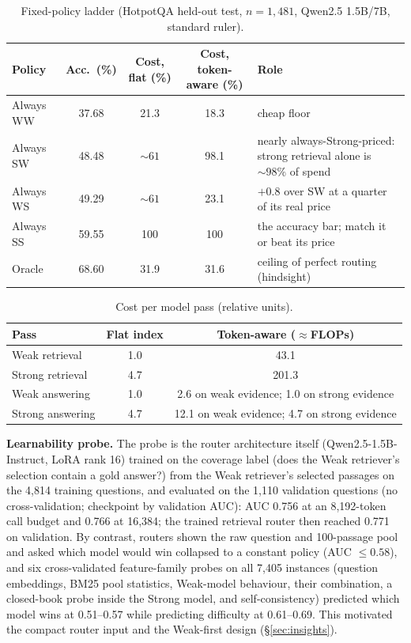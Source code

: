 \documentclass{article}
\newcommand{\W}{\textsc{W}}
\newcommand{\Sg}{\textsc{S}}
\begin{document}
\begin{table}[h]
\caption{Fixed-policy ladder (HotpotQA held-out test, $n{=}1{,}481$, Qwen2.5 1.5B/7B, standard ruler).}
\label{tab:ladder}
\centering\small
\begin{tabular}{@{}lccc p{4.6cm}@{}}
\toprule
Policy & Acc.\ (\%) & Cost, flat (\%) & Cost, token-aware (\%) & Role\\
\midrule
Always \W\W & 37.68 & 21.3 & 18.3 & cheap floor\\
Always \Sg\W & 48.48 & ${\sim}61$ & 98.1 & nearly always-Strong-priced: strong retrieval alone is ${\sim}98\%$ of spend\\
Always \W\Sg & 49.29 & ${\sim}61$ & 23.1 & $+0.8$ over \Sg\W{} at a quarter of its real price\\
Always \Sg\Sg & 59.55 & 100 & 100 & the accuracy bar; match it or beat its price\\
Oracle & 68.60 & 31.9 & 31.6 & ceiling of perfect routing (hindsight)\\
\bottomrule
\end{tabular}
\end{table}

\begin{table}[h]
\caption{Cost per model pass (relative units).}
\label{tab:passcost}
\centering\small
\begin{tabular}{@{}lcc@{}}
\toprule
Pass & Flat index & Token-aware (${\approx}$FLOPs)\\
\midrule
Weak retrieval & 1.0 & 43.1\\
Strong retrieval & 4.7 & 201.3\\
Weak answering & 1.0 & 2.6 on weak evidence; 1.0 on strong evidence\\
Strong answering & 4.7 & 12.1 on weak evidence; 4.7 on strong evidence\\
\bottomrule
\end{tabular}
\end{table}

\textbf{Learnability probe.} The probe is the router architecture itself (Qwen2.5-1.5B-Instruct, LoRA rank 16) trained on the coverage label (does the Weak retriever's selection contain a gold answer?) from the Weak retriever's selected passages on the 4,814 training questions, and evaluated on the 1,110 validation questions (no cross-validation; checkpoint by validation AUC): AUC 0.756 at an 8,192-token call budget and 0.766 at 16,384; the trained retrieval router then reached 0.771 on validation. By contrast, routers shown the raw question and 100-passage pool and asked which model would win collapsed to a constant policy (AUC ${\le}0.58$), and six cross-validated feature-family probes on all 7,405 instances (question embeddings, BM25 pool statistics, Weak-model behaviour, their combination, a closed-book probe inside the Strong model, and self-consistency) predicted which model wins at 0.51--0.57 while predicting difficulty at 0.61--0.69. This motivated the compact router input and the Weak-first design (\S\ref{sec:insights}).
\end{document}
